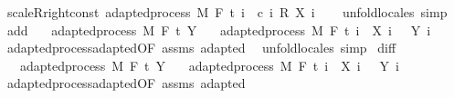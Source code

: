 \begin{isabellebody}
%
\endisadelimproof
\isanewline
{}\isamarkupfalse%
\ scaleR{\isacharunderscore}{\kern0pt}right{\isacharunderscore}{\kern0pt}const{\isacharcolon}{\kern0pt}\ {\isachardoublequoteopen}adapted{\isacharunderscore}{\kern0pt}process\ M\ F\ t\ {\isacharparenleft}{\kern0pt}{\isasymlambda}i\ {\isasymxi}{\isachardot}{\kern0pt}\ c\ i\ {\isacharasterisk}{\kern0pt}\isactrlsub R\ {\isacharparenleft}{\kern0pt}X\ i\ {\isasymxi}{\isacharparenright}{\kern0pt}{\isacharparenright}{\kern0pt}{\isachardoublequoteclose}%
\isadelimproof
\ %
\endisadelimproof
%
\isatagproof
{}\isamarkupfalse%
\ {\isacharparenleft}{\kern0pt}unfold{\isacharunderscore}{\kern0pt}locales{\isacharparenright}{\kern0pt}\ simp%
\endisatagproof
{\isafoldproof}%
%
\isadelimproof
%
\endisadelimproof
\isanewline
\isanewline
{}\isamarkupfalse%
\ add{\isacharcolon}{\kern0pt}\isanewline
\ \ \ {\isachardoublequoteopen}adapted{\isacharunderscore}{\kern0pt}process\ M\ F\ t\ Y{\isachardoublequoteclose}\isanewline
\ \ \ {\isachardoublequoteopen}adapted{\isacharunderscore}{\kern0pt}process\ M\ F\ t\ {\isacharparenleft}{\kern0pt}{\isasymlambda}i\ {\isasymxi}{\isachardot}{\kern0pt}\ X\ i\ {\isasymxi}\ {\isacharplus}{\kern0pt}\ Y\ i\ {\isasymxi}{\isacharparenright}{\kern0pt}{\isachardoublequoteclose}\isanewline
%
\isadelimproof
\ \ %
\endisadelimproof
%
\isatagproof
{}\isamarkupfalse%
\ adapted{\isacharunderscore}{\kern0pt}process{\isachardot}{\kern0pt}adapted{\isacharbrackleft}{\kern0pt}OF\ assms{\isacharbrackright}{\kern0pt}\ adapted\ \isamarkupfalse%
\ {\isacharparenleft}{\kern0pt}unfold{\isacharunderscore}{\kern0pt}locales{\isacharparenright}{\kern0pt}\ simp%
\endisatagproof
{\isafoldproof}%
%
\isadelimproof
\isanewline
%
\endisadelimproof
\isanewline
{}\isamarkupfalse%
\ diff{\isacharcolon}{\kern0pt}\isanewline
\ \ \ {\isachardoublequoteopen}adapted{\isacharunderscore}{\kern0pt}process\ M\ F\ t\ Y{\isachardoublequoteclose}\isanewline
\ \ \ {\isachardoublequoteopen}adapted{\isacharunderscore}{\kern0pt}process\ M\ F\ t\ {\isacharparenleft}{\kern0pt}{\isasymlambda}i\ {\isasymxi}{\isachardot}{\kern0pt}\ X\ i\ {\isasymxi}\ {\isacharminus}{\kern0pt}\ Y\ i\ {\isasymxi}{\isacharparenright}{\kern0pt}{\isachardoublequoteclose}\isanewline
%
\isadelimproof
\ \ %
\endisadelimproof
%
\isatagproof
{}\isamarkupfalse%
\ adapted{\isacharunderscore}{\kern0pt}process{\isachardot}{\kern0pt}adapted{\isacharbrackleft}{\kern0pt}OF\ assms{\isacharbrackright}{\kern0pt}\ adapted\ \isamarkupfalse%

\end{isabellebody}
